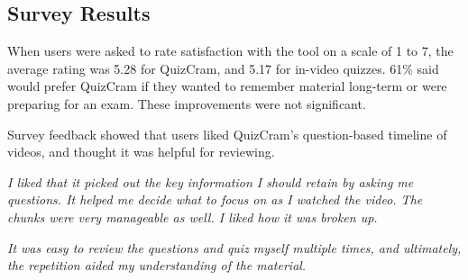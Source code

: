 \documentclass{sigchi}
\begin{document}

\subsection{Survey Results}

When users were asked to rate satisfaction with the tool on a scale of 1 to 7, the average rating was 5.28 for QuizCram, and 5.17 for in-video quizzes.  61\% said would prefer QuizCram if they wanted to remember material long-term or were preparing for an exam. These improvements were not significant.


Survey feedback showed that users liked QuizCram's question-based timeline of videos, and thought it was helpful for reviewing.

\textit{I liked that it picked out the key information I should retain by asking me questions. It helped me decide what to focus on as I watched the video. The chunks were very manageable as well. I liked how it was broken up.}

\textit{It was easy to review the questions and quiz myself multiple times, and ultimately, the repetition aided my understanding of the material.}


\end{document}

